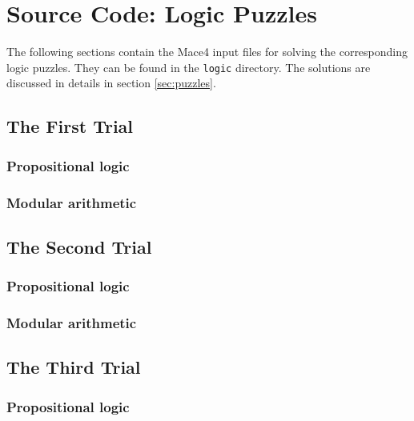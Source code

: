 \chapter{Source Code: Logic Puzzles} 
\label{sec:code_puzzle}


The following sections contain the Mace4 input files for solving the corresponding logic puzzles. They can be found in the \verb|logic| directory. The solutions are discussed in details in section \ref{sec:puzzles}. 


\section{The First Trial}

\subsection{Propositional logic}


\subsection{Modular arithmetic}
\label{lst:arith_1}



\section{The Second Trial}

\subsection{Propositional logic}

 
\subsection{Modular arithmetic}



\section{The Third Trial} 

\subsection{Propositional logic}

